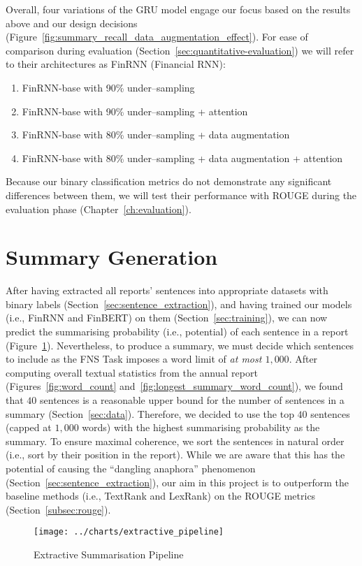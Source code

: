 Overall, four variations of the GRU model engage our focus based on the results above and our design decisions (Figure~\ref{fig:summary_recall_data_augmentation_effect}).
For ease of comparison during evaluation (Section~\ref{sec:quantitative-evaluation}) we will refer to their architectures as FinRNN (Financial RNN):
\begin{enumerate}
    \item FinRNN-base with 90\% under--sampling
    \item FinRNN-base with 90\% under--sampling + attention
    \item FinRNN-base with 80\% under--sampling + data augmentation
    \item FinRNN-base with 80\% under--sampling + data augmentation + attention
\end{enumerate}
Because our binary classification metrics do not demonstrate any significant differences between them, we will
test their performance with ROUGE during the evaluation phase (Chapter~\ref{ch:evaluation}).


\section{Summary Generation}\label{sec:summary-generation}
After having extracted all reports' sentences into appropriate datasets with binary labels (Section~\ref{sec:sentence_extraction}),
and having trained our models (i.e., FinRNN and FinBERT) on them (Section~\ref{sec:training}),
we can now predict the summarising probability (i.e., potential) of each sentence in a report (Figure~\ref{fig:summary_generation}).
Nevertheless, to produce a summary, we must decide which sentences to include as the FNS Task imposes a word limit of \emph{at most $1,000$}.
After computing overall textual statistics from the annual report (Figures~\ref{fig:word_count} and~\ref{fig:longest_summary_word_count}),
we found that $40$ sentences is a reasonable upper bound for the number of sentences in a summary (Section~\ref{sec:data}).
Therefore, we decided to use the top $40$ sentences (capped at $1,000$ words) with the highest summarising probability as the summary.
To ensure maximal coherence, we sort the sentences in natural order (i.e., sort by their position in the report).
While we are aware that this has the potential of causing the \enquote{dangling anaphora} phenomenon (Section~\ref{sec:sentence_extraction}),
our aim in this project is to outperform the baseline methods (i.e., TextRank and LexRank) on the ROUGE metrics (Section~\ref{subsec:rouge}).
\begin{figure}[ht]
    \centering
    \texttt{[image: ../charts/extractive\_pipeline]}
    \caption{Extractive Summarisation Pipeline}
    \label{fig:summary_generation}
\end{figure}